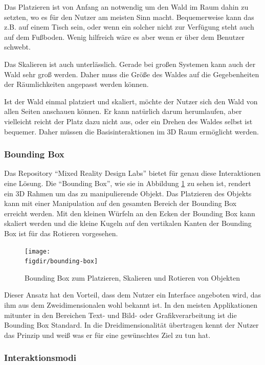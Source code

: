 Das Platzieren ist von Anfang an notwendig um den Wald im Raum dahin zu setzten, wo es für den Nutzer am meisten Sinn macht. Bequemerweise kann das z.B. auf einem Tisch sein, oder wenn ein solcher nicht zur Verfügung steht auch auf dem Fußboden. Wenig hilfreich wäre es aber wenn er über dem Benutzer schwebt.

Das Skalieren ist auch unterlässlich. Gerade bei großen Systemen kann auch der Wald sehr groß werden. Daher muss die Größe des Waldes auf die Gegebenheiten der Räumlichkeiten angepasst werden können.

Ist der Wald einmal platziert und skaliert, möchte der Nutzer sich den Wald von allen Seiten anschauen können. Er kann natürlich darum herumlaufen, aber vielleicht reicht der Platz dazu nicht aus, oder ein Drehen des Waldes selbst ist bequemer. Daher müssen die Basisinteraktionen im 3D Raum ermöglicht werden.

\subsubsection*{Bounding Box}

Das Repository "`Mixed Reality Design Labs"' bietet für genau diese Interaktionen eine Lösung. Die "`Bounding Box"', wie sie in Abbildung \ref{fig:bounding-box} zu sehen ist, rendert ein 3D Rahmen um das zu manipulierende Objekt. Das Platzieren des Objekts kann mit einer Manipulation auf den gesamten Bereich der Bounding Box erreicht werden. Mit den kleinen Würfeln an den Ecken der Bounding Box kann skaliert werden und die kleine Kugeln auf den vertikalen Kanten der Bounding Box ist für das Rotieren vorgesehen.

\begin{figure}[htb]
  \texttt{[image: \\figdir/bounding-box]}
  \caption{Bounding Box zum Platzieren, Skalieren und Rotieren von Objekten}
  \label{fig:bounding-box}
\end{figure}

Dieser Ansatz hat den Vorteil, dass dem Nutzer ein Interface angeboten wird, das ihm aus dem Zweidimensionalen wohl bekannt ist. In den meisten Applikationen mitunter in den Bereichen Text- und Bild- oder Grafikverarbeitung ist die Bounding Box Standard. In die Dreidimensionalität übertragen kennt der Nutzer das Prinzip und weiß was er für eine gewünschtes Ziel zu tun hat.

\subsubsection*{Interaktionsmodi}

